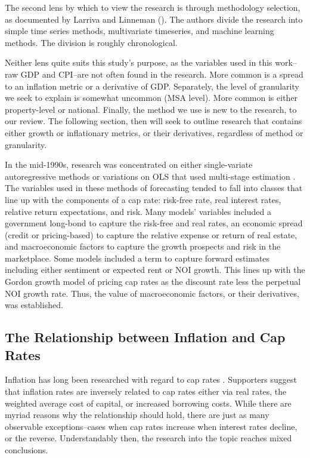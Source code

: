 The second lens by which to view the research is through methodology selection, as documented by Larriva and Linneman (\citeyear{larriva2021determinants}). The authors divide the research into simple time series methods, multivariate timeseries, and machine learning methods. The division is roughly chronological. 

Neither lens quite suits this study's purpose, as the variables used in this work--raw GDP and CPI--are not often found in the research. More common is a spread to an inflation metric or a derivative of GDP. Separately, the level of granularity we seek to explain is somewhat uncommon (MSA level). More common is either property-level or national. Finally, the method we use is new to the research, to our review. The following section, then will seek to outline research that contains either growth or inflationary metrics, or their derivatives, regardless of method or granularity.

In the mid-1990s, research was concentrated on either single-variate autoregressive methods \citep*{gau_1984,gau_1985,linneman_1986} or variations on OLS that used multi-stage estimation \citep*{case_shiller_1990,abraham_hendershott_1994}. The variables used in these methods of forecasting tended to fall into classes that line up with the components of a cap rate: risk-free rate, real interest rates, relative return expectations, and risk. Many models’ variables included a government long-bond  to capture the risk-free and real rates, an economic spread (credit or pricing-based) to capture the relative expense or return of real estate, and macroeconomic factors to capture the  growth prospects and risk in the marketplace. Some models included a term to capture forward estimates including either sentiment or expected rent or NOI growth. This lines up with the Gordon growth model of pricing cap rates as the discount rate less the perpetual NOI growth rate. Thus, the value of macroeconomic factors, or their derivatives, was established.

\subsection{The Relationship between Inflation and Cap Rates}

Inflation has long been researched with regard to cap rates \citep*{froland1987determines, sivitanides2001determinants, chandrashekaran2000predictability}. Supporters suggest that inflation rates are inversely related to cap rates either via real rates, the weighted average  cost of capital, or increased borrowing costs. While there are myriad reasons why the relationship should hold, there are just as many observable exceptions--cases when cap rates increase when interest rates decline, or the reverse. Understandably then, the research into the topic reaches mixed conclusions.

